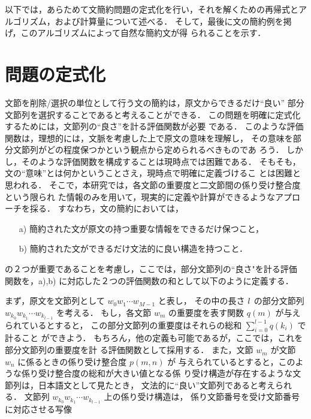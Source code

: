 以下では，あらためて文簡約問題の定式化を行い，それを解くための再帰式とア
ルゴリズム，および計算量について述べる．
そして，最後に文の簡約例を掲げ，このアルゴリズムによって自然な簡約文が得
られることを示す．

\section{問題の定式化}

文節を削除/選択の単位として行う文の簡約は，原文からできるだけ``良い''
部分文節列を選択することであると考えることができる．
この問題を明確に定式化するためには，文節列の``良さ''を計る評価関数が必要
である．
このような評価関数は，理想的には，文脈を考慮した上で原文の意味を理解し，
その意味を部分文節列がどの程度保つかという観点から定められるべきものであ
ろう．
しかし，そのような評価関数を構成することは現時点では困難である．
そもそも，文の``意味''とは何かということさえ，現時点で明確に定義づけるこ
とは困難と思われる．
そこで，本研究では，各文節の重要度と二文節間の係り受け整合度という限られ
た情報のみを用いて，現実的に定義や計算ができるようなアプローチを採る．
すなわち，文の簡約においては，

\begin{itemize}
\item[a)] 簡約された文が原文の持つ重要な情報をできるだけ保つこと，
\item[b)] 簡約された文ができるだけ文法的に良い構造を持つこと．
\end{itemize}
\noindent
の２つが重要であることを考慮し，ここでは，部分文節列の``良さ"を計る評価
関数を，a),b) に対応した２つの評価関数の和として以下のように定義する．

まず，原文を文節列として $w_{0}w_{1}\cdots w_{M-1}$ と表し，
その中の長さ $l\/$ の部分文節列 $w_{k_{0}}w_{k_{1}}\cdots w_{k_{l-1}}$ 
を考える．
もし，各文節 $w_{m}$ の重要度を表す関数 $q(m)$ が与えられているとすると，
この部分文節列の重要度はそれらの総和 $\sum_{i=0}^{l-1}q(k_i)$ で計ること
ができよう．
もちろん，他の定義も可能であるが，ここでは，これを部分文節列の重要度を計
る評価関数として採用する．
また，文節 $w_{m}$ が文節 $w_{n}$ に係るときの係り受け整合度 $p(m,n)$ が
与えられているとすると，このような係り受け整合度の総和が大きい値となる係
り受け構造が存在するような文節列は，日本語文として見たとき，
文法的に``良い''文節列であると考えられる．
文節列 $w_{k_{0}}w_{k_{1}}\cdots w_{k_{l-1}}$ 上の係り受け構造は，
係り文節番号を受け文節番号に対応させる写像

